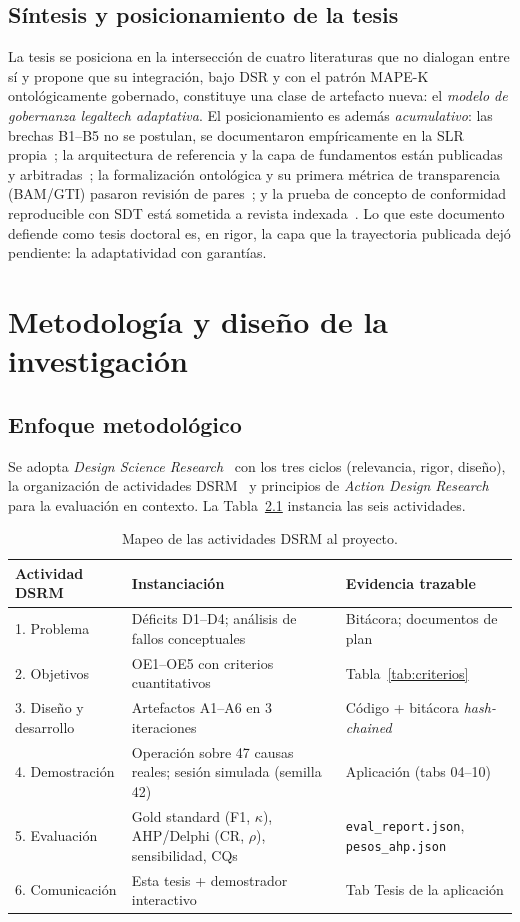 \documentclass[a4paper,openany,12pt]{book}
\begin{document}
\section{Síntesis y posicionamiento de la tesis}
La tesis se posiciona en la intersección de cuatro literaturas que no dialogan entre sí y propone que su integración, bajo DSR y con el patrón MAPE-K ontológicamente gobernado, constituye una clase de artefacto nueva: el \emph{modelo de gobernanza legaltech adaptativa}. El posicionamiento es además \emph{acumulativo}: las brechas B1--B5 no se postulan, se documentaron empíricamente en la SLR propia~\cite{paccha2025slr}; la arquitectura de referencia y la capa de fundamentos están publicadas y arbitradas~\cite{paccha2026colim,paccha2026silos}; la formalización ontológica y su primera métrica de transparencia (BAM/GTI) pasaron revisión de pares~\cite{paccha2026etcm}; y la prueba de concepto de conformidad reproducible con SDT está sometida a revista indexada~\cite{paccha2026info}. Lo que este documento defiende como tesis doctoral es, en rigor, la capa que la trayectoria publicada dejó pendiente: la adaptatividad con garantías.

\chapter{Metodología y diseño de la investigación}
\section{Enfoque metodológico}
Se adopta \textit{Design Science Research}~\cite{hevner2004} con los tres ciclos (relevancia, rigor, diseño), la organización de actividades DSRM~\cite{peffers2007} y principios de \textit{Action Design Research}~\cite{sein2011} para la evaluación en contexto. La Tabla~\ref{tab:dsrm} instancia las seis actividades.
\begin{table}[H]\centering\footnotesize
\caption{Mapeo de las actividades DSRM al proyecto.}\label{tab:dsrm}
\begin{tabular}{p{3.6cm}p{5.6cm}p{4.2cm}}\toprule
\textbf{Actividad DSRM} & \textbf{Instanciación} & \textbf{Evidencia trazable} \\ \midrule
1. Problema & Déficits D1--D4; análisis de fallos conceptuales & Bitácora; documentos de plan \\
2. Objetivos & OE1--OE5 con criterios cuantitativos & Tabla~\ref{tab:criterios} \\
3. Diseño y desarrollo & Artefactos A1--A6 en 3 iteraciones & Código + bitácora \textit{hash-chained} \\
4. Demostración & Operación sobre 47 causas reales; sesión simulada (semilla 42) & Aplicación (tabs 04--10) \\
5. Evaluación & Gold standard (F1, $\kappa$), AHP/Delphi (CR, $\rho$), sensibilidad, CQs & \texttt{eval\_report.json}, \texttt{pesos\_ahp.json} \\
6. Comunicación & Esta tesis + demostrador interactivo & Tab Tesis de la aplicación \\ \bottomrule
\end{tabular}\end{table}
\end{document}
